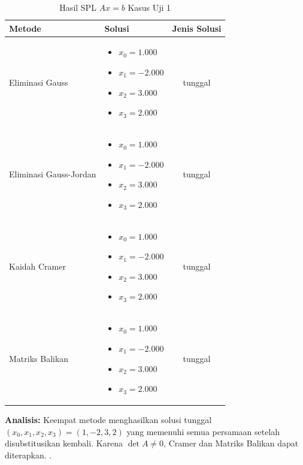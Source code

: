 \documentclass[12pt,a4paper]{report}
\begin{document}
\begin{table}[H]
    \centering
    \caption{Hasil SPL $Ax=b$ Kasus Uji 1}
    \begin{tabular}{|l|p{5cm}|c|}
        \hline
        \textbf{Metode} & \textbf{Solusi} & \textbf{Jenis Solusi} \\
        \hline
        Eliminasi Gauss & 
        \begin{itemize}
            \item $x_0 = 1.000$
            \item $x_1 = -2.000$
            \item $x_2 = 3.000$
            \item $x_3 = 2.000$
        \end{itemize} 
        & tunggal\\
        \hline
        Eliminasi Gauss-Jordan & 
        \begin{itemize}
            \item $x_0 = 1.000$
            \item $x_1 = -2.000$
            \item $x_2 = 3.000$
            \item $x_3 = 2.000$
        \end{itemize} 
        & tunggal \\
        \hline
        Kaidah Cramer & 
        \begin{itemize}
            \item $x_0 = 1.000$
            \item $x_1 = -2.000$
            \item $x_2 = 3.000$
            \item $x_3 = 2.000$
        \end{itemize} 
        & tunggal \\
        \hline
        Matriks Balikan & 
        \begin{itemize}
            \item $x_0 = 1.000$
            \item $x_1 = -2.000$
            \item $x_2 = 3.000$
            \item $x_3 = 2.000$
        \end{itemize} 
        & tunggal \\
        \hline
    \end{tabular}
\end{table}

 
\textbf{Analisis:} Keempat metode menghasilkan solusi tunggal $(x_0,x_1,x_2,x_3)=(1,-2,3,2)$ yang memenuhi semua persamaan setelah disubstitusikan kembali. Karena $\det A \neq 0$, Cramer dan Matriks Balikan dapat diterapkan. .
\end{document}
